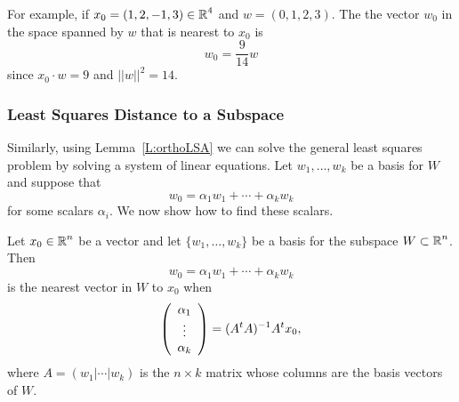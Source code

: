\documentclass{ximera}
\begin{document}
For example, if $x_0=(1,2,-1,3)\in\mbox{$\mathbb{R}$}^4$ and $w=(0,1,2,3)$.  The the vector
$w_0$ in the space spanned by $w$ that is nearest to $x_0$ is
\[
w_0 = \frac{9}{14}w
\]
since $x_0\cdot w=9$ and $||w||^2=14$.

\subsubsection*{Least Squares Distance to a Subspace}

Similarly, using Lemma~\ref{L:orthoLSA} we can solve the general least
squares problem by solving a system of linear equations.  Let
$w_1,\ldots,w_k$ be a basis for $W$ and suppose that
\[
w_0 = \alpha_1w_1 + \cdots + \alpha_kw_k
\]
for some scalars $\alpha_i$.  We now show how to find these scalars.

\begin{theorem}  \label{T:nearestvector}
Let $x_0\in\mbox{$\mathbb{R}$}^n$ be a vector and let $\{w_1,\ldots,w_k\}$ be a
basis for the subspace $W\subset\mbox{$\mathbb{R}$}^n$.
Then
\begin{equation} \label{e:w_0_in_basis}
w_0 = \alpha_1w_1 + \cdots + \alpha_kw_k
\end{equation}
is the nearest vector in $W$ to $x_0$ when
\begin{equation}  \label{E:nearestvector}
\left(\begin{array}{c} \alpha_1 \\ \vdots \\ \alpha_k \end{array}\right) =
(A^tA)^{-1} A^tx_0,
\end{equation}
where $A=(w_1|\cdots|w_k)$ is the $n\times k$ matrix whose columns are the
basis vectors of $W$.
\end{theorem}
\end{document}
